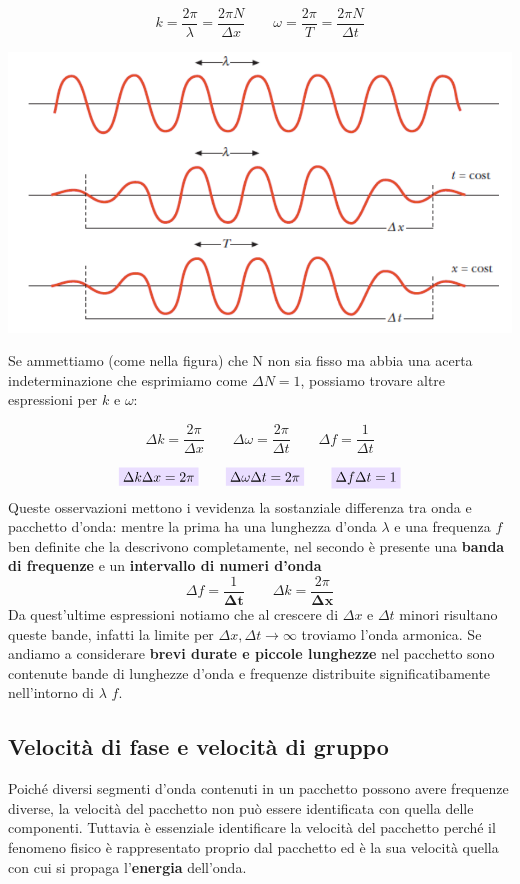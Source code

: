 \documentclass[x11names]{report}
\newcommand{\viola}[1]{\colorbox{yred}{$\displaystyle #1$}}
\begin{document}
	\[ 
	k = \frac{2\pi}{\lambda}= \frac{2\pi N}{\Delta x} \qquad \omega = \frac{2\pi}{T} = \frac{2\pi N}{\Delta t}
	\]
	
	\vspace{0.2cm}
	\begin{center}
		\includegraphics[scale=0.4]{imgs/pacchetti.png}
	\end{center}
	\vspace{0.2cm}
	
	Se ammettiamo (come nella figura) che N non sia fisso ma abbia una acerta indeterminazione che esprimiamo come \(\Delta N = 1\), possiamo trovare altre espressioni per \(k\) e \(\omega\):
	
	\[ 
	\boxed{\Delta k = \frac{2\pi}{\Delta x}} \qquad \boxed{ \Delta\omega = \frac{2\pi}{\Delta t}} \qquad \boxed{\Delta f = \frac{1}{\Delta t}}
	\]
	
	\[ 
	\viola{\Delta k \Delta x = 2\pi} \qquad \viola{\Delta \omega \Delta t = 2\pi} \qquad \viola{\Delta f \Delta t = 1}
	\]
	Queste osservazioni mettono i vevidenza la sostanziale differenza tra onda e pacchetto d'onda: mentre la prima ha una lunghezza d'onda \(\lambda\)  e una frequenza \(f\) ben definite che la descrivono completamente, nel secondo è presente una \textbf{banda di frequenze} e un \textbf{intervallo di numeri d'onda}
	\[ 
	\Delta f = \frac{1}{\boldsymbol{\Delta t}} \qquad \Delta k = \frac{2\pi}{\boldsymbol{\Delta x}}
	\]
	Da quest'ultime espressioni notiamo che al crescere di \(\Delta x\) e \(\Delta t\) minori risultano queste bande, infatti la limite per \(\Delta x,\Delta t \to \infty\) troviamo l'onda armonica. Se andiamo a considerare \textbf{brevi durate e piccole lunghezze} nel pacchetto sono contenute bande di lunghezze d'onda e frequenze distribuite significatibamente nell'intorno di \(\lambda\) \(f\).
	
	\subsection{Velocità di fase e velocità di gruppo}
	Poiché diversi segmenti d'onda contenuti in un pacchetto possono avere frequenze diverse, la velocità del pacchetto non può essere identificata con quella delle componenti. Tuttavia è essenziale identificare la velocità del pacchetto perché il fenomeno fisico è rappresentato proprio dal pacchetto ed è la sua velocità quella con cui si propaga l'\textbf{energia} dell'onda.     
	
\end{document}
